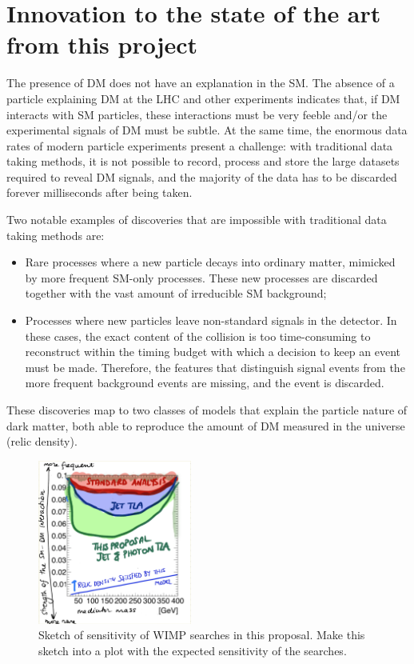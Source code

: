 \documentclass[11pt,a4paper]{article}
\begin{document}
\section{Innovation to the state of the art from this project} 
\smallskip

The presence of DM does not have an explanation in the SM. 
The absence of a particle explaining DM at the LHC and other experiments indicates that, if DM interacts with SM particles, these interactions must be very feeble and/or the experimental signals of DM must be subtle. 
At the same time, the enormous data rates of modern particle experiments present a challenge: with traditional data taking methods, it is not possible to record, process and store the large datasets required to reveal DM signals, and the majority of the data has to be discarded forever milliseconds after being taken. 
  
Two notable examples of discoveries that are impossible with traditional data taking methods are:
\begin{itemize} 
\item Rare processes where a new particle decays into ordinary matter, mimicked by more frequent SM-only processes.
These new processes are discarded together with the vast amount of irreducible SM background;
\item Processes where new particles leave non-standard signals in the detector. 
In these cases, the exact content of the collision is too time-consuming to reconstruct within the timing budget with which a decision to keep an event must be made. Therefore, the features that distinguish signal events from the more frequent background events are missing, and the event is discarded.
\end{itemize}

These discoveries map to two classes of models that explain the particle nature of dark matter, both able to reproduce the amount of DM measured in the universe (relic density). 

\begin{figure} 
\begin{center}
\includegraphics[width=0.45\textwidth]{figs/SensitivityWIMP.png}
\caption{Sketch of sensitivity of WIMP searches in this proposal. \scriptsize \color{red} Make this sketch into a plot with the expected sensitivity of the searches. \color{black}\label{fig:pastFutureConstraints} }
\end{center}
\end{figure}
\end{document}
